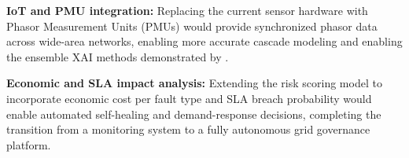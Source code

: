 \textbf{IoT and PMU integration:} Replacing the current sensor hardware with Phasor Measurement Units (PMUs) would provide synchronized phasor data across wide-area networks, enabling more accurate cascade modeling and enabling the ensemble XAI methods demonstrated by \textcite{PMUEnsemble2024}.

\textbf{Economic and SLA impact analysis:} Extending the risk scoring model to incorporate economic cost per fault type and SLA breach probability would enable automated self-healing and demand-response decisions, completing the transition from a monitoring system to a fully autonomous grid governance platform.
